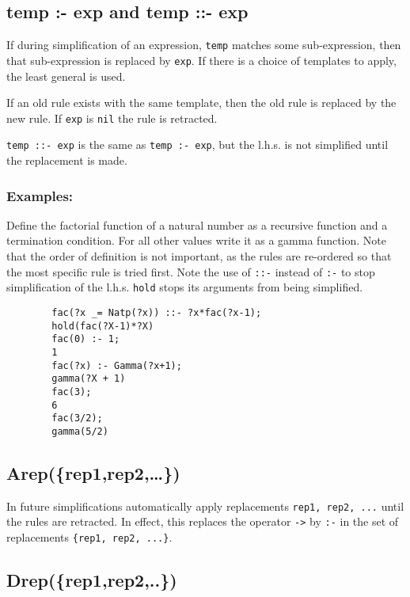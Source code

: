 \subsection{temp :- exp and temp ::- exp}

If during simplification of an expression, \texttt{temp} matches some
sub-expression, then that sub-expression is replaced by \texttt{exp}.  If there
is a choice of templates to apply, the least general is used.

If an old rule exists with the same template, then the old rule is replaced by
the new rule.  If \texttt{exp} is \texttt{nil} the rule is retracted.

\texttt{temp ::- exp} is the same as \texttt{temp :- exp}, but the l.h.s. is not
simplified until the replacement is made.

\subsubsection*{Examples:}

Define the factorial function of a natural number as a recursive function and a
termination condition.  For all other values write it as a gamma function.  Note
that the order of definition is not important, as the rules are re-ordered so
that the most specific rule is tried first.  Note the use of \texttt{::-}
instead of \texttt{:-} to stop simplification of the l.h.s.  \texttt{hold} stops
its arguments from being simplified.
\begin{verbatim}
        fac(?x _= Natp(?x)) ::- ?x*fac(?x-1);
        hold(fac(?X-1)*?X)
        fac(0) :- 1;
        1
        fac(?x) :- Gamma(?x+1);
        gamma(?X + 1)
        fac(3);
        6
        fac(3/2);
        gamma(5/2)
\end{verbatim}



\subsection{Arep(\{rep1,rep2,\ldots\})}

In future simplifications automatically apply replacements \texttt{rep1, rep2,
  ...} until the rules are retracted.  In effect, this replaces the operator
\texttt{->} by \texttt{:-} in the set of replacements \texttt{\{rep1, rep2,
  ...\}}.


\subsection{Drep(\{rep1,rep2,..\})}

